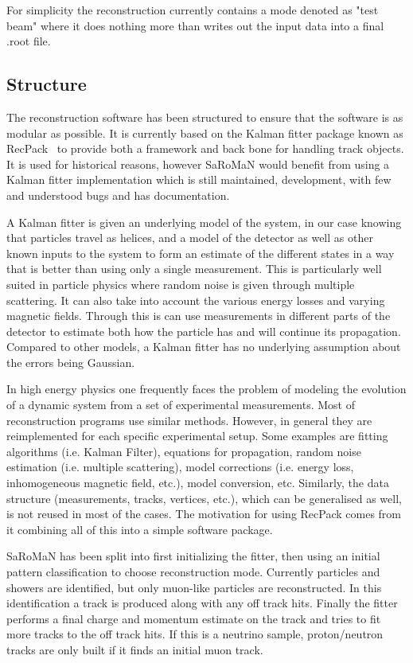 For simplicity the reconstruction currently contains a mode denoted as "test beam" where it does nothing more than writes out the input data into a final .root file.

\subsection{Structure}
The reconstruction software has been structured to ensure that the software is as modular as possible. It is currently based on the Kalman fitter package known as RecPack~\cite{RecPack} to provide both a framework and back bone for handling track objects. It is used for historical reasons, however SaRoMaN would benefit from using a Kalman fitter implementation which is still maintained, development, with few and understood bugs and has documentation.

A Kalman fitter is given an underlying model of the system, in our case knowing that particles travel as helices, and a model of the detector as well as other known inputs to the system to form an estimate of the different states in a way that is better than using only a single measurement. This is particularly well suited in particle physics where random noise is given through multiple scattering. It can also take into account the various energy losses and varying magnetic fields. Through this is can use measurements in different parts of the detector to estimate both how the particle has and will continue its propagation. Compared to other models, a Kalman fitter has no underlying assumption about the errors being Gaussian.

In high energy physics one frequently faces the problem of modeling the evolution of a dynamic system from a set of experimental measurements. Most of reconstruction programs use similar methods. However, in general they are reimplemented for each specific experimental setup. Some examples are fitting algorithms (i.e. Kalman Filter), equations for propagation, random noise estimation (i.e. multiple scattering), model corrections (i.e. energy loss, inhomogeneous magnetic field, etc.), model conversion, etc. Similarly, the data structure (measurements, tracks, vertices, etc.), which can be generalised as well, is not reused in most of the cases. The motivation for using RecPack comes from it combining all of this into a simple software package.

SaRoMaN has been split into first initializing the fitter, then using an initial pattern classification to choose reconstruction mode. Currently particles and showers are identified, but only muon-like particles are reconstructed. In this identification a track is produced along with any off track hits. Finally the fitter performs a final charge and momentum estimate on the track and tries to fit more tracks to the off track hits. If this is a neutrino sample, proton/neutron tracks are only built if it finds an initial muon track.

